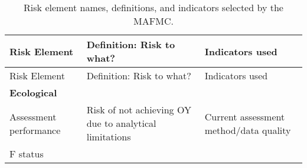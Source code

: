 \documentclass[11pt,]{article}
\begin{document}
\begin{longtable}[]{@{}lll@{}}
\caption{Risk element names, definitions, and indicators selected by the
MAFMC. \label{elements}}\tabularnewline
\toprule
\begin{minipage}[b]{0.25\columnwidth}\raggedright\strut
Risk Element\strut
\end{minipage} & \begin{minipage}[b]{0.33\columnwidth}\raggedright\strut
Definition: Risk to what?\strut
\end{minipage} & \begin{minipage}[b]{0.33\columnwidth}\raggedright\strut
Indicators used\strut
\end{minipage}\tabularnewline
\midrule
\endfirsthead
\toprule
\begin{minipage}[b]{0.25\columnwidth}\raggedright\strut
Risk Element\strut
\end{minipage} & \begin{minipage}[b]{0.33\columnwidth}\raggedright\strut
Definition: Risk to what?\strut
\end{minipage} & \begin{minipage}[b]{0.33\columnwidth}\raggedright\strut
Indicators used\strut
\end{minipage}\tabularnewline
\midrule
\endhead
\begin{minipage}[t]{0.25\columnwidth}\raggedright\strut
\textbf{Ecological}\strut
\end{minipage} & \begin{minipage}[t]{0.33\columnwidth}\raggedright\strut
\strut
\end{minipage} & \begin{minipage}[t]{0.33\columnwidth}\raggedright\strut
\strut
\end{minipage}\tabularnewline
\begin{minipage}[t]{0.25\columnwidth}\raggedright\strut
Assessment performance\strut
\end{minipage} & \begin{minipage}[t]{0.33\columnwidth}\raggedright\strut
Risk of not achieving OY due to analytical limitations\strut
\end{minipage} & \begin{minipage}[t]{0.33\columnwidth}\raggedright\strut
Current assessment method/data quality\strut
\end{minipage}\tabularnewline
\begin{minipage}[t]{0.25\columnwidth}\raggedright\strut
F status\strut
\end{minipage} & \begin{minipage}[t]{0.33\columnwidth}\raggedright\strut

\end{minipage}
\end{longtable}
\end{document}
